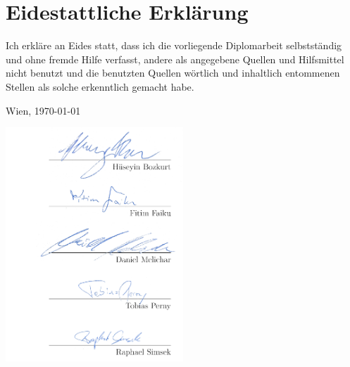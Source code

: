 \section*{Eidestattliche Erklärung}
Ich erkläre an Eides statt, dass ich die vorliegende Diplomarbeit selbstständig und ohne fremde Hilfe verfasst, andere als angegebene Quellen und Hilfsmittel nicht benutzt und die benutzten Quellen wörtlich und inhaltlich entommenen Stellen als solche erkenntlich gemacht habe.

\vspace{0.5cm}

Wien, \today

\vspace{1.5cm}

\includegraphics[width=0.5\textwidth, right]{special/eides}
